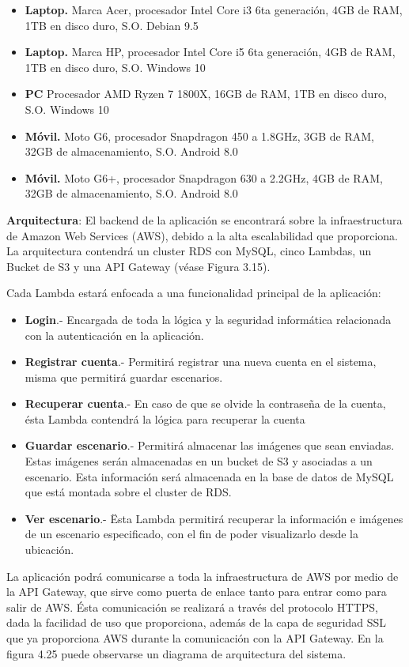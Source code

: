 \begin{itemize}
	\item \textbf{Laptop.} Marca Acer, procesador Intel Core i3 6ta generación, 4GB de RAM, 1TB en disco duro, S.O. Debian 9.5
	\item \textbf{Laptop.} Marca HP, procesador Intel Core i5 6ta generación, 4GB de RAM, 1TB en disco duro, S.O. Windows 10
	\item \textbf{PC} Procesador AMD Ryzen 7 1800X, 16GB de RAM, 1TB en disco duro, S.O. Windows 10
	\item \textbf{Móvil.} Moto G6, procesador Snapdragon 450 a 1.8GHz, 3GB de RAM, 32GB de almacenamiento, S.O. Android 8.0
	\item \textbf{Móvil.} Moto G6+, procesador Snapdragon 630 a 2.2GHz, 4GB de RAM, 32GB de almacenamiento, S.O. Android 8.0	
\end{itemize}
\noindent
\textbf{Arquitectura}:
El backend de la aplicación se encontrará sobre la infraestructura de Amazon Web Services (AWS), debido a la alta escalabilidad que proporciona. La arquitectura contendrá un cluster RDS con MySQL, cinco Lambdas, un Bucket de S3 y una API Gateway (véase Figura 3.15).\par
Cada Lambda estará enfocada a una funcionalidad principal de la aplicación:\par
\begin{itemize}
	\item\textbf{Login}.- Encargada de toda la lógica y la seguridad informática relacionada con la autenticación en la aplicación.
	\item\textbf{Registrar cuenta}.- Permitirá registrar una nueva cuenta en el sistema, misma que permitirá guardar escenarios.
	\item\textbf{Recuperar cuenta}.- En caso de que se olvide la contraseña de la cuenta, ésta Lambda contendrá la lógica para recuperar la cuenta
	\item\textbf{Guardar escenario}.- Permitirá almacenar las imágenes que sean enviadas. Estas imágenes serán almacenadas en un bucket de S3 y asociadas a un escenario. Esta información será almacenada en la base de datos de MySQL que está montada sobre el cluster de RDS.
	\item\textbf{Ver escenario}.- Ësta Lambda permitirá recuperar la información e imágenes de un escenario especificado, con el fin de poder visualizarlo desde la ubicación.
\end{itemize}
\noindent
La aplicación podrá comunicarse a toda la infraestructura de AWS por medio de la API Gateway, que sirve como puerta de enlace tanto para entrar como para salir de AWS. Ésta comunicación se realizará a través del protocolo HTTPS, dada la facilidad de uso que proporciona, además de la capa de seguridad SSL que ya proporciona AWS durante la comunicación con la API Gateway. En la figura 4.25 puede observarse un diagrama de arquitectura del sistema.

